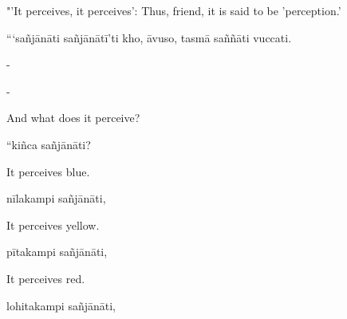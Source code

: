 \begin{samepage}
\begin{leftcolumn*}
"'It perceives, it perceives': Thus, friend, it is said to be 'perception.'
\end{leftcolumn*}

\begin{rightcolumn}
“‘sañjānāti sañjānātī’ti kho, āvuso, tasmā saññāti vuccati.
\end{rightcolumn}
\end{samepage}

\begin{samepage}
\begin{leftcolumn*}
-
\end{leftcolumn*}

\begin{rightcolumn}
-
\end{rightcolumn}
\end{samepage}

\begin{samepage}
\begin{leftcolumn*}
And what does it perceive?
\end{leftcolumn*}

\begin{rightcolumn}
“kiñca sañjānāti?
\end{rightcolumn}
\end{samepage}

\begin{samepage}
\begin{leftcolumn*}
It perceives blue.
\end{leftcolumn*}

\begin{rightcolumn}
nīlakampi sañjānāti,
\end{rightcolumn}
\end{samepage}

\begin{samepage}
\begin{leftcolumn*}
It perceives yellow.
\end{leftcolumn*}

\begin{rightcolumn}
pītakampi sañjānāti,
\end{rightcolumn}
\end{samepage}

\begin{samepage}
\begin{leftcolumn*}
It perceives red.
\end{leftcolumn*}

\begin{rightcolumn}
lohitakampi sañjānāti,
\end{rightcolumn}
\end{samepage}

